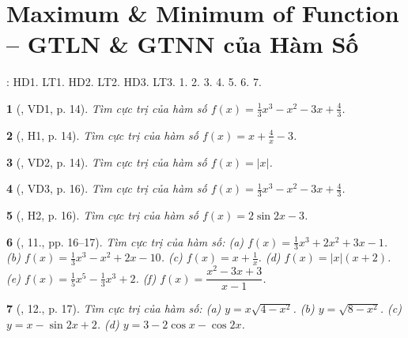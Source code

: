 \documentclass{article}
\newtheorem{baitoan}{}
\begin{document}

\section{Maximum \& Minimum of Function -- GTLN \& GTNN của Hàm Số}
\cite[Chap. I, \S2, pp. 15--20]{SGK_Toan_12_Canh_Dieu_tap_1}: HD1. LT1. HD2. LT2. HD3. LT3. 1. 2. 3. 4. 5. 6. 7.

\begin{baitoan}[\cite{SGK_Toan_12_giai_tich_nang_cao}, VD1, p. 14]
	Tìm cực trị của hàm số $f(x) = \frac{1}{3}x^3 - x^2 - 3x + \frac{4}{3}$.
\end{baitoan}

\begin{baitoan}[\cite{SGK_Toan_12_giai_tich_nang_cao}, H1, p. 14]
	Tìm cực trị của hàm số $f(x) = x + \frac{4}{x} - 3$.
\end{baitoan}

\begin{baitoan}[\cite{SGK_Toan_12_giai_tich_nang_cao}, VD2, p. 14]
	Tìm cực trị của hàm số $f(x) = |x|$.
\end{baitoan}

\begin{baitoan}[\cite{SGK_Toan_12_giai_tich_nang_cao}, VD3, p. 16]
	Tìm cực trị của hàm số $f(x) = \frac{1}{3}x^3 - x^2 - 3x + \frac{4}{3}$.
\end{baitoan}

\begin{baitoan}[\cite{SGK_Toan_12_giai_tich_nang_cao}, H2, p. 16]
	Tìm cực trị của hàm số $f(x) = 2\sin2x - 3$.
\end{baitoan}

\begin{baitoan}[\cite{SGK_Toan_12_giai_tich_nang_cao}, 11., pp. 16--17]
	Tìm cực trị của hàm số: (a) $f(x) = \frac{1}{3}x^3 + 2x^2 + 3x - 1$. (b) $f(x) = \frac{1}{3}x^3 - x^2 + 2x - 10$. (c) $f(x) = x + \frac{1}{x}$. (d) $f(x) = |x|(x + 2)$. (e) $f(x) = \frac{1}{5}x^5 - \frac{1}{3}x^3 + 2$. (f) $f(x) = \dfrac{x^2 - 3x + 3}{x - 1}$.
\end{baitoan}

\begin{baitoan}[\cite{SGK_Toan_12_giai_tich_nang_cao}, 12., p. 17]
	Tìm cực trị của hàm số: (a) $y = x\sqrt{4 - x^2}$. (b) $y = \sqrt{8 - x^2}$. (c) $y = x - \sin2x + 2$. (d) $y = 3 - 2\cos x - \cos2x$.
\end{baitoan}
\end{document}
